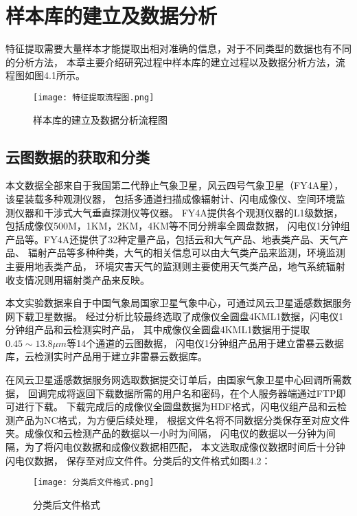 
\chapter{样本库的建立及数据分析}
特征提取需要大量样本才能提取出相对准确的信息，对于不同类型的数据也有不同的分析方法，
本章主要介绍研究过程中样本库的建立过程以及数据分析方法，流程图如图4.1所示。
\begin{figure}[htb]
    \centering
    \texttt{[image: 特征提取流程图.png]}
    \caption{样本库的建立及数据分析流程图}
\end{figure}

\section{云图数据的获取和分类}
本文数据全部来自于我国第二代静止气象卫星，风云四号气象卫星（FY4A星），该星装载多种观测仪器，
包括多通道扫描成像辐射计、闪电成像仪、空间环境监测仪器和干涉式大气垂直探测仪等仪器。
FY4A提供各个观测仪器的L1级数据，包括成像仪500M，1KM，2KM，4KM等不同分辨率全圆盘数据，
闪电仪1分钟组产品等。FY4A还提供了32种定量产品，包括云和大气产品、地表类产品、天气产品、
辐射产品等多种种类，大气的相关信息可以由大气类产品来监测，环境监测主要用地表类产品，
环境灾害天气的监测则主要使用天气类产品，地气系统辐射收支情况则用辐射类产品来反映。

本文实验数据来自于中国气象局国家卫星气象中心，可通过风云卫星遥感数据服务网下载卫星数据。
经过分析比较最终选取了成像仪全圆盘4KML1数据，闪电仪1分钟组产品和云检测实时产品，
其中成像仪全圆盘4KML1数据用于提取$0.45\sim13.8\mu m$等14个通道的云图数据，
闪电仪1分钟组产品用于建立雷暴云数据库，云检测实时产品用于建立非雷暴云数据库。

在风云卫星遥感数据服务网选取数据提交订单后，由国家气象卫星中心回调所需数据，
回调完成将返回下载数据所需的用户名和密码，在个人服务器端通过FTP即可进行下载。
下载完成后的成像仪全圆盘数据为HDF格式，闪电仪组产品和云检测产品为NC格式，为方便后续处理，
根据文件名将不同数据分类保存至对应文件夹。成像仪和云检测产品的数据以一小时为间隔，
闪电仪的数据以一分钟为间隔，为了将闪电仪数据和成像仪数据相匹配，
本文选取成像仪数据时间后十分钟闪电仪数据，
保存至对应文件件。分类后的文件格式如图4.2：
\begin{figure}[htb]
    \centering
    \texttt{[image: 分类后文件格式.png]}
    \caption{分类后文件格式}
\end{figure}

